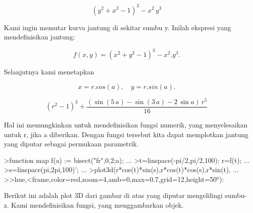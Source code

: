 \documentclass[12pt,Times new roman,letterpaper]{book}
\begin{document}
\begin{eulernootebook}
\begin{eulercomment}
\begin{eulercomment}
\begin{eulernootebook}
\begin{eulercomment}
\begin{eulercomment}
\begin{eulercomment}
\begin{eulercomment}
\begin{eulercomment}
\begin{eulercomment}
\begin{eulercomment}
\begin{eulernotebook}
\begin{eulerformula}
\[
\left(y^2+x^2-1\right)^3-x^2\,y^3
\]
\end{eulerformula}
\begin{eulercomment}
Kami ingin memutar kurva jantung di sekitar sumbu y. Inilah ekspresi
yang mendefinisikan jantung:

\end{eulercomment}
\begin{eulerformula}
\[
f(x,y)=(x^2+y^2-1)^3-x^2.y^3.
\]
\end{eulerformula}
\begin{eulercomment}
Selanjutnya kami menetapkan

\end{eulercomment}
\begin{eulerformula}
\[
x=r.cos(a),\quad y=r.sin(a).
\]
\end{eulerformula}
\begin{eulerformula}
\[
\left(r^2-1\right)^3+\frac{\left(\sin \left(5\,a\right)-\sin \left(
 3\,a\right)-2\,\sin a\right)\,r^5}{16}
\]
\end{eulerformula}
\begin{eulercomment}
Hal ini memungkinkan untuk mendefinisikan fungsi numerik, yang
menyelesaikan untuk r, jika a diberikan. Dengan fungsi tersebut kita
dapat memplotkan jantung yang diputar sebagai permukaan parametrik.
\end{eulercomment}
\begin{eulerprompt}
>function map f(a) := bisect("fr",0,2;a); ...
>t=linspace(-pi/2,pi/2,100); r=f(t);  ...
>s=linspace(pi,2pi,100)'; ...
>plot3d(r*cos(t)*sin(s),r*cos(t)*cos(s),r*sin(t), ...
>>hue,<frame,color=red,zoom=4,amb=0,max=0.7,grid=12,height=50°):
\end{eulerprompt}
\begin{eulercomment}
Berikut ini adalah plot 3D dari gambar di atas yang diputar
mengelilingi sumbu-z. Kami mendefinisikan fungsi, yang menggambarkan
objek.


\end{eulercomment}
\end{eulernotebook}
\end{eulercomment}
\end{eulercomment}
\end{eulercomment}
\end{eulercomment}
\end{eulercomment}
\end{eulercomment}
\end{eulercomment}
\end{eulernootebook}
\end{eulercomment}
\end{eulercomment}
\end{eulernootebook}
\end{document}
